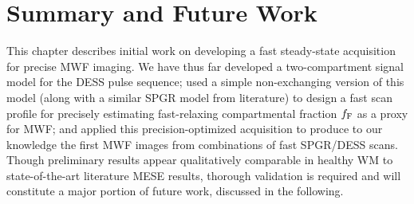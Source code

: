 

\section{Summary and Future Work}
\label{s,mwf,summ}

This chapter describes initial work 
on developing a fast steady-state acquisition
for precise MWF imaging.
We have thus far developed
a two-compartment signal model 
for the DESS pulse sequence;
used a simple non-exchanging version 
of this model 
(along with a similar SPGR model
from literature)
to design a fast scan profile
for precisely estimating 
fast-relaxing compartmental fraction $f_{\mathrm{F}}$
as a proxy for MWF;
and applied this precision-optimized acquisition
\invivo to produce to our knowledge the first MWF images 
from combinations of fast SPGR/DESS scans.
Though preliminary results appear qualitatively comparable
in healthy WM
to state-of-the-art literature MESE results,
thorough validation is required
and will constitute a major portion 
of future work,
discussed in the following.

